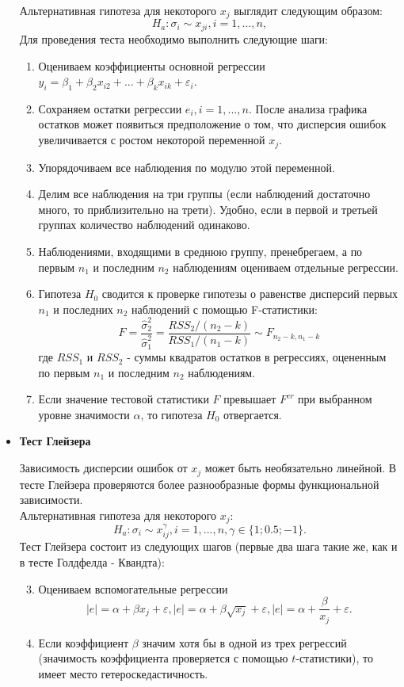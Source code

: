 \documentclass[a0,final]{a0poster}
\begin{document}
\begin{multicols}{4}
\begin{itemize}
Альтернативная гипотеза для некоторого $x_j$ выглядит следующим образом:
$$H_a: \sigma_i \sim x_{ji},  i = 1, ..., n,$$
Для проведения теста необходимо выполнить следующие шаги:\\

\begin{enumerate}
\item Оцениваем коэффициенты основной регрессии $y_i = \beta_1 + \beta_2x_{i2} + ... + \beta_kx_{ik} + \varepsilon_i$.
\item Сохраняем остатки регрессии $e_i,  i = 1, ..., n$. После анализа графика остатков может появиться предположение о том, что дисперсия ошибок увеличивается с ростом некоторой переменной $x_j$.
\item Упорядочиваем все наблюдения по модулю этой переменной.
\item Делим все наблюдения на три группы (если наблюдений достаточно много, то приблизительно на трети). Удобно, если в первой и третьей группах количество наблюдений одинаково.
\item Наблюдениями, входящими в среднюю группу, пренебрегаем, а по первым $n_1$ и последним $n_2$ наблюдениям оцениваем отдельные регрессии.
\item Гипотеза $H_0$ сводится к проверке гипотезы о равенстве дисперсий первых $n_1$ и последних $n_2$ наблюдений с помощью F-статистики: $$F = \frac{\hat{\sigma}^2_{2}}{\hat{\sigma}^2_{1}} = \frac{RSS_2/{(n_2 - k)}}{RSS_1/{(n_1 - k)}} \sim F_{n_2-k, n_1-k}$$где $RSS_1$ и $RSS_2$ - суммы квадратов остатков в регрессиях, оцененным по первым $n_1$ и последним $n_2$ наблюдениям.
\item Если значение тестовой статистики $F$ превышает $F^{cr}$ при выбранном уровне значимости $\alpha$, то гипотеза $H_0$ отвергается.
\end{enumerate}

\item \textbf{Тест Глейзера}

Зависимость дисперсии ошибок от $x_j$ может быть необязательно линейной. В тесте Глейзера проверяются более разнообразные формы функциональной зависимости. \\

Альтернативная гипотеза для некоторого $x_j$: $$H_a: \sigma_i \sim x_{ij}^\gamma,  i = 1, ..., n, \gamma \in \{1; 0.5; -1\}.$$
Тест Глейзера состоит из следующих шагов (первые два шага такие же, как и в тесте Голдфелда - Квандта):
\begin{enumerate}
\setcounter{enumi}{2}
\item Оцениваем вспомогательные регрессии $$|e| = \alpha + \beta x_j + \varepsilon, |e| = \alpha + \beta \sqrt{x_j} + \varepsilon, |e| = \alpha + \frac{\beta} {x_j} + \varepsilon.$$
\item Если коэффициент $\beta$ значим хотя бы в одной из трех регрессий (значимость коэффициента проверяется с помощью $t$-статистики), то имеет место гетероскедастичность.\\
\end{enumerate}


\end{itemize}
\end{multicols}
\end{document}
